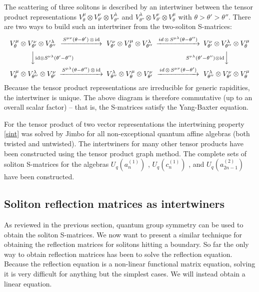 \documentclass[a4paper,12pt]{article}
\newcommand{\id}{\text{id}}
\numberwithin{equation}{section}
\begin{document}
The scattering of three solitons is described by an intertwiner
between the tensor product representations $V^\mu_{\theta}\otimes
V^\nu_{\theta'}\otimes V^\lambda_{\theta''}$ and
$V^\lambda_{\theta''}\otimes V^\nu_{\theta'}\otimes
V^\mu_{\theta}$ with $\theta>\theta'>\theta''$. There are two ways
to build such an intertwiner from the two-soliton S-matrices:
\begin{equation}
\begin{CD}
  V^\mu_{\theta}\otimes V^\nu_{\theta'}\otimes V^\lambda_{\theta''}
  @>{S^{\mu\nu}(\theta-\theta')\,\otimes\,\id}>>
  V^\nu_{\theta'}\otimes V^\mu_{\theta}\otimes V^\lambda_{\theta''}
  @>{id\,\otimes\, S^{\mu\lambda}(\theta-\theta'')}>>
  V^\nu_{\theta'}\otimes V^\lambda_{\theta''}\otimes V^\mu_{\theta}
  \\
  @VV{\id\otimes S^{\nu\lambda}(\theta'-\theta'')}V
  @.
  @V{S^{\nu\lambda}(\theta'-\theta'')\otimes\id}VV
  \\
  V^\mu_{\theta}\otimes V^\lambda_{\theta''}\otimes V^\nu_{\theta'}
  @>{S^{\mu\lambda}(\theta-\theta'')\,\otimes\,\id}>>
  V^\lambda_{\theta''}\otimes V^\mu_{\theta}\otimes V^\nu_{\theta'}
  @>{id\,\otimes\, S^{\mu\nu}(\theta-\theta')}>>
  V^\lambda_{\theta''}\otimes V^\nu_{\theta'}\otimes V^\mu_{\theta}
\end{CD}
\end{equation}
Because the tensor product representations are irreducible for
generic rapidities, the intertwiner is unique. The above diagram
is therefore commutative (up to an overall scalar factor) -- that
is, the S-matrices satisfy the Yang-Baxter equation.

For the tensor product of two vector representations the
intertwining property \eqref{sint} was solved by Jimbo
\cite{Jim86} for all non-exceptional quantum affine algebras (both
twisted and untwisted). The intertwiners for many other tensor
products have been constructed \cite{Del94} using the tensor
product graph method. The complete sets of soliton S-matrices for
the algebras $U_q(a_n^{(1)})$ \cite{Hol92}, $U_q(c_n^{(1)})$
\cite{Gan95}, and $U_q(a^{(2)}_{2n-1})$ \cite{Gan96} have been
constructed.





\subsection{Soliton reflection matrices as intertwiners\label{sectsrmi}}

As reviewed in the previous section, quantum group symmetry can be
used to obtain the soliton S-matrices. We now want to present a
similar technique for obtaining the reflection matrices for
solitons hitting a boundary. So far the only way to obtain
reflection matrices has been to solve the reflection equation.
Because the reflection equation is a non-linear functional matrix
equation, solving it is very difficult for anything but the
simplest cases. We will instead obtain a linear equation.
\end{document}
